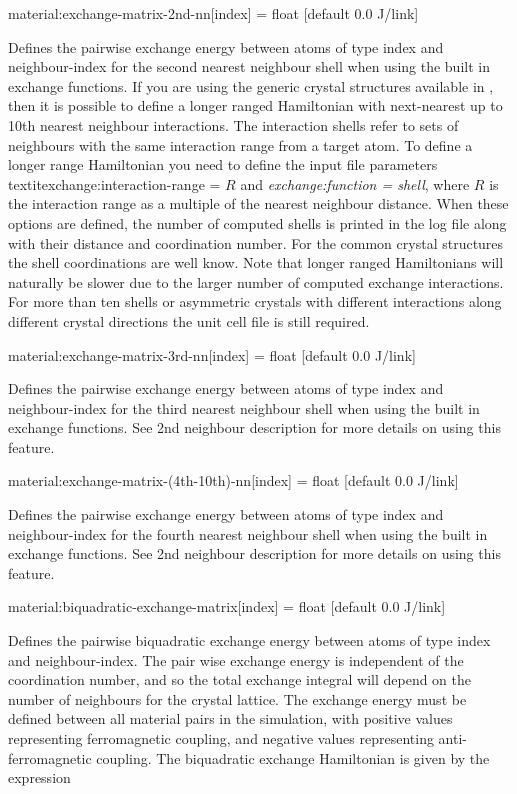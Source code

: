 {\zicf material:exchange-matrix-2nd-nn[index] = float [default 0.0 J/link]}
Defines the pairwise exchange energy between atoms of type index and
neighbour-index for the second nearest neighbour shell when using the built in
exchange functions. If you are using the generic crystal structures available
in \vampire, then it is possible to define a longer ranged Hamiltonian with
next-nearest up to 10th nearest neighbour interactions. The interaction shells
refer to sets of neighbours with the same interaction range from a target atom.
To define a longer range Hamiltonian you need to define the input file
parameters  textit{exchange:interaction-range = $R$} and
\textit{exchange:function = shell}, where $R$ is the interaction range as a
multiple of the nearest neighbour distance. When these options are defined, the
number of computed shells is printed in the log file along with their distance
and coordination number. For the common crystal structures the shell
coordinations are well know. Note that longer ranged Hamiltonians will naturally
be slower due to the larger number of computed exchange interactions. For more
than ten shells or asymmetric crystals with different interactions along
different crystal directions the unit cell file is still required.

{\zicf material:exchange-matrix-3rd-nn[index] = float [default 0.0 J/link]}
Defines the pairwise exchange energy between atoms of type index and
neighbour-index for the third nearest neighbour shell when using the built in
exchange functions. See 2nd neighbour description for more details on using
this feature.

{\zicf material:exchange-matrix-(4th-10th)-nn[index] = float [default 0.0 J/link]}
Defines the pairwise exchange energy between atoms of type index and
neighbour-index for the fourth nearest neighbour shell when using the built in
exchange functions. See 2nd neighbour description for more details on using this
feature.

{\zicf material:biquadratic-exchange-matrix[index] = float [default 0.0 J/link]}
Defines the pairwise biquadratic exchange energy between atoms of type index and
neighbour-index. The pair wise exchange energy is independent of the
coordination number, and so the total exchange integral will depend on the
number of neighbours for the crystal lattice. The exchange energy must be
defined between all material pairs in the simulation, with positive values
representing ferromagnetic coupling, and negative values representing
anti-ferromagnetic coupling. The biquadratic exchange Hamiltonian is given by
the expression

